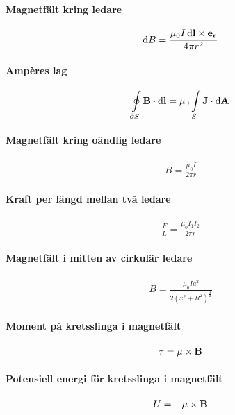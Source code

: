 \paragraph{Magnetfält kring ledare}
\begin{align*}
	\dd{B} = \frac{\mu_0I\dd{\vect{l}}\times\vect{e}_{\vect{r}}}{4\pi r^2}
\end{align*}

\paragraph{Ampères lag}
\begin{align*}
	\oint\limits_{\partial S}\vect{B}\cdot\dd{\vect{l}} = \mu_0\int\limits_{S}\vect{J}\cdot\dd{\vect{A}}
\end{align*}

\paragraph{Magnetfält kring oändlig ledare}
\begin{align*}
	B = \frac{\mu_0I}{2\pi r}
\end{align*}

\paragraph{Kraft per längd mellan två ledare}
\begin{align*}
	\frac{F}{L} = \frac{\mu_0I_1I_2}{2\pi r}
\end{align*}

\paragraph{Magnetfält i mitten av cirkulär ledare}
\begin{align*}
	B = \frac{\mu_0Ia^2}{2(x^2 + R^2)^\frac{3}{2}}
\end{align*}

\paragraph{Moment på kretsslinga i magnetfält}
\begin{align*}
	\vect{\tau} = \vect{\mu}\times\vect{B}
\end{align*}

\paragraph{Potensiell energi för kretsslinga i magnetfält}
\begin{align*}
	U = -\vect{\mu}\times\vect{B}
\end{align*}

